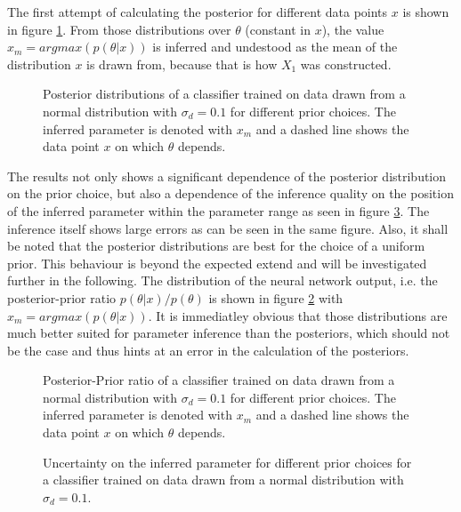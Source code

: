 \documentclass{article}
\begin{document}
The first attempt of calculating the posterior for different data points $x$ is shown in figure \ref{fig:prior_per_parameter_1e0}.
From those distributions over $\theta$ (constant in $x$), the value $x_m = argmax(p(\theta|x))$ is inferred and undestood as the mean
of the distribution $x$ is drawn from, because that is how $X_1$ was constructed.

\begin{figure}[ht]
    \centering
    
    \caption{Posterior distributions of a classifier trained on data drawn from a normal distribution with $\sigma_d=0.1$ for different prior choices. The inferred parameter is denoted with $x_m$ and a dashed line shows the data point $x$ on which $\theta$ depends.}
    \label{fig:prior_per_parameter_1e0}
\end{figure}


The results not only shows a significant dependence of the posterior distribution on the prior choice,
but also a dependence of the inference quality on the position of the inferred parameter within the parameter range as seen in figure \ref{fig:errorbars_1e0}.
The inference itself shows large errors as can be seen in the same figure.
Also, it shall be noted that the posterior distributions are best for the choice of a uniform prior.
This behaviour is beyond the expected extend and will be investigated further in the following. The distribution of the neural network output,
i.e. the posterior-prior ratio $p(\theta|x)/p(\theta)$ is shown in figure \ref{fig:parameter_per_prior_1e0} with $x_m = argmax(p(\theta|x))$.
It is immediatley obvious that those distributions are much better suited for parameter inference than the posteriors, which should not be the case
and thus hints at an error in the calculation of the posteriors.

\begin{figure}[ht]
    \centering
    
    \caption{Posterior-Prior ratio of a classifier trained on data drawn from a normal distribution with $\sigma_d=0.1$ for different prior choices. The inferred parameter is denoted with $x_m$ and a dashed line shows the data point $x$ on which $\theta$ depends.}
    \label{fig:parameter_per_prior_1e0}
\end{figure}
\begin{figure}[ht]
    \centering
    
    \caption{Uncertainty on the inferred parameter for different prior choices for a classifier trained on data drawn from a normal distribution with $\sigma_d=0.1$.}
    \label{fig:errorbars_1e0}
\end{figure}
\end{document}
